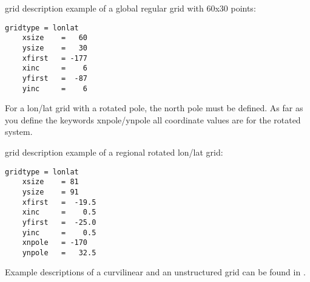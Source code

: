 \vspace{2mm}

{\CDO} grid description example of a global regular grid with 60x30 points:
\begin{lstlisting}[frame=single, backgroundcolor=\color{pcolor1}, basicstyle=\footnotesize]
    gridtype = lonlat
    xsize    =   60
    ysize    =   30
    xfirst   = -177
    xinc     =    6
    yfirst   =  -87
    yinc     =    6
\end{lstlisting}

\vspace{2mm}

For a lon/lat grid with a rotated pole, the north pole must be defined.
As far as you define the keywords xnpole/ynpole all coordinate values
are for the rotated system.

\vspace{2mm}

{\CDO} grid description example of a regional rotated lon/lat grid:
\begin{lstlisting}[frame=single, backgroundcolor=\color{pcolor1}, basicstyle=\footnotesize]
    gridtype = lonlat
    xsize    = 81
    ysize    = 91
    xfirst   =  -19.5
    xinc     =    0.5
    yfirst   =  -25.0
    yinc     =    0.5
    xnpole   = -170
    ynpole   =   32.5
\end{lstlisting}

Example {\CDO} descriptions of a curvilinear and an unstructured grid can be found
in .








